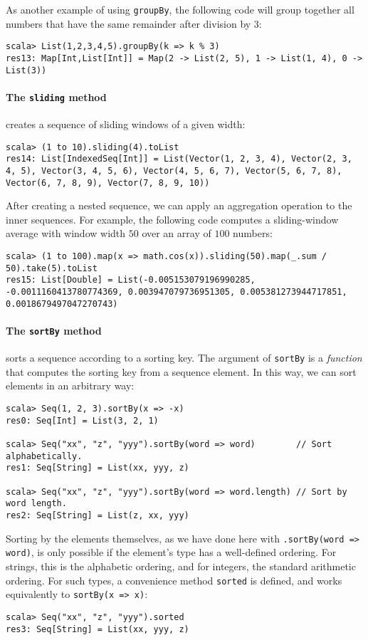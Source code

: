 As another example of using \lstinline!groupBy!, the following code
will group together all numbers that have the same remainder after
division by $3$:
\begin{lstlisting}
scala> List(1,2,3,4,5).groupBy(k => k % 3)
res13: Map[Int,List[Int]] = Map(2 -> List(2, 5), 1 -> List(1, 4), 0 -> List(3))
\end{lstlisting}


\paragraph*{The \texttt{sliding} method}

creates a sequence of sliding windows of a given width:
\begin{lstlisting}
scala> (1 to 10).sliding(4).toList
res14: List[IndexedSeq[Int]] = List(Vector(1, 2, 3, 4), Vector(2, 3, 4, 5), Vector(3, 4, 5, 6), Vector(4, 5, 6, 7), Vector(5, 6, 7, 8), Vector(6, 7, 8, 9), Vector(7, 8, 9, 10))
\end{lstlisting}
After creating a nested sequence, we can apply an aggregation operation
to the inner sequences. For example, the following code computes a
sliding-window average with window width $50$ over an array of $100$
numbers:
\begin{lstlisting}
scala> (1 to 100).map(x => math.cos(x)).sliding(50).map(_.sum / 50).take(5).toList
res15: List[Double] = List(-0.005153079196990285, -0.0011160413780774369, 0.003947079736951305, 0.005381273944717851, 0.0018679497047270743)
\end{lstlisting}


\paragraph*{The \texttt{sortBy} method}

sorts a sequence according to a sorting key. The argument of \lstinline!sortBy!
is a \emph{function} that computes the sorting key from a sequence
element. In this way, we can sort elements in an arbitrary way:
\begin{lstlisting}
scala> Seq(1, 2, 3).sortBy(x => -x)
res0: Seq[Int] = List(3, 2, 1)

scala> Seq("xx", "z", "yyy").sortBy(word => word)        // Sort alphabetically.
res1: Seq[String] = List(xx, yyy, z)

scala> Seq("xx", "z", "yyy").sortBy(word => word.length) // Sort by word length.
res2: Seq[String] = List(z, xx, yyy)
\end{lstlisting}
Sorting by the elements themselves, as we have done here with \lstinline!.sortBy(word => word)!,
is only possible if the element\textsf{'}s type has a well-defined ordering.
For strings, this is the alphabetic ordering, and for integers, the
standard arithmetic ordering. For such types, a convenience method
\lstinline!sorted! is defined, and works equivalently to \lstinline!sortBy(x => x)!:
\begin{lstlisting}
scala> Seq("xx", "z", "yyy").sorted
res3: Seq[String] = List(xx, yyy, z)
\end{lstlisting}


